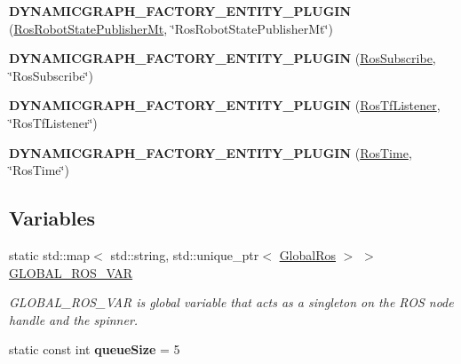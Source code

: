 \begin{DoxyCompactItemize}
{\bfseries D\+Y\+N\+A\+M\+I\+C\+G\+R\+A\+P\+H\+\_\+\+F\+A\+C\+T\+O\+R\+Y\+\_\+\+E\+N\+T\+I\+T\+Y\+\_\+\+P\+L\+U\+G\+IN} (\hyperlink{classdynamic__graph_1_1RosRobotStatePublisherMt}{Ros\+Robot\+State\+Publisher\+Mt}, \char`\"{}Ros\+Robot\+State\+Publisher\+Mt\char`\"{})
\item 
\mbox{\label{namespacedynamic__graph_a24be3cc119b4b41a177e8ba207bcc913}} 
{\bfseries D\+Y\+N\+A\+M\+I\+C\+G\+R\+A\+P\+H\+\_\+\+F\+A\+C\+T\+O\+R\+Y\+\_\+\+E\+N\+T\+I\+T\+Y\+\_\+\+P\+L\+U\+G\+IN} (\hyperlink{classdynamic__graph_1_1RosSubscribe}{Ros\+Subscribe}, \char`\"{}Ros\+Subscribe\char`\"{})
\item 
\mbox{\label{namespacedynamic__graph_abac5365c03bd21273a726cfa0229d855}} 
{\bfseries D\+Y\+N\+A\+M\+I\+C\+G\+R\+A\+P\+H\+\_\+\+F\+A\+C\+T\+O\+R\+Y\+\_\+\+E\+N\+T\+I\+T\+Y\+\_\+\+P\+L\+U\+G\+IN} (\hyperlink{classdynamic__graph_1_1RosTfListener}{Ros\+Tf\+Listener}, \char`\"{}Ros\+Tf\+Listener\char`\"{})
\item 
\mbox{\label{namespacedynamic__graph_a03b74e5f10c4867ed50665454ac7f7cd}} 
{\bfseries D\+Y\+N\+A\+M\+I\+C\+G\+R\+A\+P\+H\+\_\+\+F\+A\+C\+T\+O\+R\+Y\+\_\+\+E\+N\+T\+I\+T\+Y\+\_\+\+P\+L\+U\+G\+IN} (\hyperlink{classdynamic__graph_1_1RosTime}{Ros\+Time}, \char`\"{}Ros\+Time\char`\"{})
\end{DoxyCompactItemize}
\subsection*{Variables}
\begin{DoxyCompactItemize}
\item 
static std\+::map$<$ std\+::string, std\+::unique\+\_\+ptr$<$ \hyperlink{structdynamic__graph_1_1GlobalRos}{Global\+Ros} $>$ $>$ \hyperlink{namespacedynamic__graph_a877a1ed0d2adf7f675abf17f70b936a6}{G\+L\+O\+B\+A\+L\+\_\+\+R\+O\+S\+\_\+\+V\+AR}
\begin{DoxyCompactList}\small\item\em G\+L\+O\+B\+A\+L\+\_\+\+R\+O\+S\+\_\+\+V\+AR is global variable that acts as a singleton on the R\+OS node handle and the spinner. \end{DoxyCompactList}\item 
\mbox{\label{namespacedynamic__graph_a9394ef64acc51dd774b27249864f6c33}} 
static const int {\bfseries queue\+Size} = 5
\end{DoxyCompactItemize}


